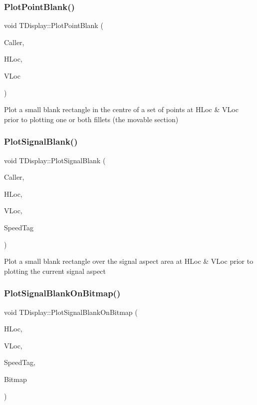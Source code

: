 \subsubsection{\texorpdfstring{Plot\+Point\+Blank()}{PlotPointBlank()}}
{\footnotesize\ttfamily void T\+Display\+::\+Plot\+Point\+Blank (\begin{DoxyParamCaption}\item[{int}]{Caller,  }\item[{int}]{H\+Loc,  }\item[{int}]{V\+Loc }\end{DoxyParamCaption})}

Plot a small blank rectangle in the centre of a set of points at H\+Loc \& V\+Loc prior to plotting one or both fillets (the movable section) \mbox{\label{class_t_display_a69c85bcbafea6cba5f06a93ffae7d3b2}} 
\subsubsection{\texorpdfstring{Plot\+Signal\+Blank()}{PlotSignalBlank()}}
{\footnotesize\ttfamily void T\+Display\+::\+Plot\+Signal\+Blank (\begin{DoxyParamCaption}\item[{int}]{Caller,  }\item[{int}]{H\+Loc,  }\item[{int}]{V\+Loc,  }\item[{int}]{Speed\+Tag }\end{DoxyParamCaption})}

Plot a small blank rectangle over the signal aspect area at H\+Loc \& V\+Loc prior to plotting the current signal aspect \mbox{\label{class_t_display_ab6c0da6543f57f83107fd0af371fec3e}} 
\subsubsection{\texorpdfstring{Plot\+Signal\+Blank\+On\+Bitmap()}{PlotSignalBlankOnBitmap()}}
{\footnotesize\ttfamily void T\+Display\+::\+Plot\+Signal\+Blank\+On\+Bitmap (\begin{DoxyParamCaption}\item[{int}]{H\+Loc,  }\item[{int}]{V\+Loc,  }\item[{int}]{Speed\+Tag,  }\item[{Graphics\+::\+T\+Bitmap $\ast$}]{Bitmap }\end{DoxyParamCaption})}

